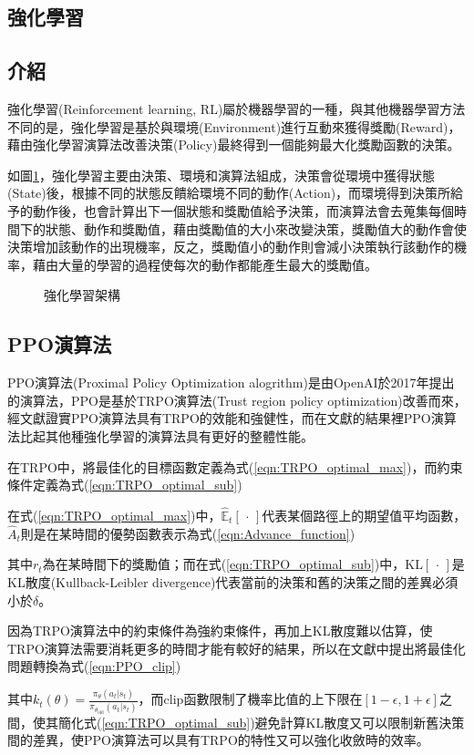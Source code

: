 \documentclass[a4paper, onecolumn, 11pt, AutoFakeBold]{article}
\newcommand{\figref}[1]{圖\ref{#1}}
\renewcommand{\eqref}[1]{式(\ref{#1})}
\begin{document}
\begin{multicols*}{2}
\smallskip
\section{強化學習}
\subsection{介紹}
\par
強化學習(Reinforcement learning, RL)屬於機器學習的一種，與其他機器學習方法不同的是，強化學習是基於與環境(Environment)進行互動來獲得獎勵(Reward)，藉由強化學習演算法改善決策(Policy)最終得到一個能夠最大化獎勵函數的決策。
\par
如\figref{fig:RL_architecture}，強化學習主要由決策、環境和演算法組成，決策會從環境中獲得狀態(State)後，根據不同的狀態反饋給環境不同的動作(Action)，而環境得到決策所給予的動作後，也會計算出下一個狀態和獎勵值給予決策，而演算法會去蒐集每個時間下的狀態、動作和獎勵值，藉由獎勵值的大小來改變決策，獎勵值大的動作會使決策增加該動作的出現機率，反之，獎勵值小的動作則會減小決策執行該動作的機率，藉由大量的學習的過程使每次的動作都能產生最大的獎勵值。
\begin{figure}[H]
    \centering
    
    \caption{強化學習架構}
    \label{fig:RL_architecture}
\end{figure}

\smallskip
\subsection{PPO演算法}
\par
PPO演算法(Proximal Policy Optimization alogrithm)是由OpenAI於2017年提出的演算法，PPO是基於TRPO演算法(Trust region policy optimization)改善而來，經文獻\cite{PPO_algorithms}證實PPO演算法具有TRPO的效能和強健性，而在文獻\cite{PPO_algorithms}的結果裡PPO演算法比起其他種強化學習的演算法具有更好的整體性能。
\par
在TRPO中，將最佳化的目標函數定義為\eqref{eqn:TRPO_optimal_max}，而約束條件定義為\eqref{eqn:TRPO_optimal_sub}

\noindent 在\eqref{eqn:TRPO_optimal_max}中，$\hat{\mathbb{E}}_t[\,\cdot\,]$代表某個路徑上的期望值平均函數，$\hat{A}_t$則是在某時間的優勢函數表示為\eqref{eqn:Advance_function}

\noindent 其中$r_t$為在某時間下的獎勵值；而在\eqref{eqn:TRPO_optimal_sub}中，$\text{KL}[\,\cdot\,]$是KL散度(Kullback-Leibler divergence)代表當前的決策和舊的決策之間的差異必須小於$\delta$。
\par
因為TRPO演算法中的約束條件為強約束條件，再加上KL散度難以估算，使TRPO演算法需要消耗更多的時間才能有較好的結果，所以在文獻\cite{PPO_algorithms}中提出將最佳化問題轉換為\eqref{eqn:PPO_clip}

\noindent 其中$k_t(\theta)=\frac{\pi_{\theta}(a_t|s_t)}{\pi_{\theta_\text{old}}(a_t|s_t)}$，而clip函數限制了機率比值的上下限在$\left[1-\epsilon, 1+\epsilon\right]$之間，使其簡化\eqref{eqn:TRPO_optimal_sub}避免計算KL散度又可以限制新舊決策間的差異，使PPO演算法可以具有TRPO的特性又可以強化收斂時的效率。


\end{multicols*}
\end{document}
